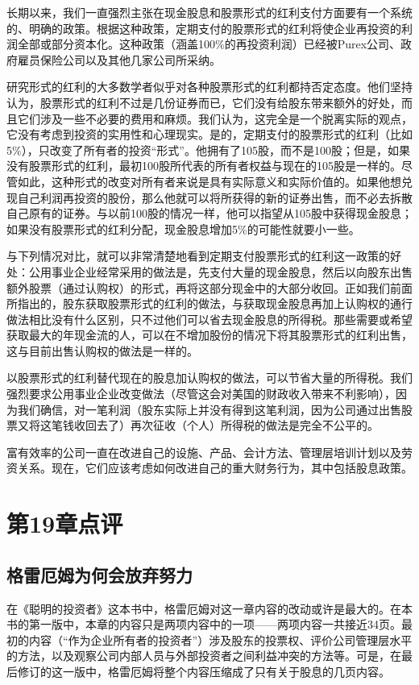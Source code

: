 \documentclass[12pt,oneside]{book}
\begin{document}
长期以来，我们一直强烈主张在现金股息和股票形式的红利支付方面要有一个系统的、明确的政策。根据这种政策，定期支付的股票形式的红利将使企业再投资的利润全部或部分资本化。这种政策（涵盖100\%的再投资利润）已经被Purex公司、政府雇员保险公司以及其他几家公司所采纳。

研究形式的红利的大多数学者似乎对各种股票形式的红利都持否定态度。他们坚持认为，股票形式的红利不过是几份证券而已，它们没有给股东带来额外的好处，而且它们涉及一些不必要的费用和麻烦。我们认为，这完全是一个脱离实际的观点，它没有考虑到投资的实用性和心理现实。是的，定期支付的股票形式的红利（比如5\%），只改变了所有者的投资“形式”。他拥有了105股，而不是100股；但是，如果没有股票形式的红利，最初100股所代表的所有者权益与现在的105股是一样的。尽管如此，这种形式的改变对所有者来说是具有实际意义和实际价值的。如果他想兑现自己利润再投资的股份，那么他就可以将所获得的新的证券出售，而不必去拆散自己原有的证券。与以前100股的情况一样，他可以指望从105股中获得现金股息；如果没有股票形式的红利分配，现金股息增加5\%的可能性就要小一些。

与下列情况对比，就可以非常清楚地看到定期支付股票形式的红利这一政策的好处：公用事业企业经常采用的做法是，先支付大量的现金股息，然后以向股东出售额外股票（通过认购权）的形式，再将这部分现金中的大部分收回。正如我们前面所指出的，股东获取股票形式的红利的做法，与获取现金股息再加上认购权的通行做法相比没有什么区别，只不过他们可以省去现金股息的所得税。那些需要或希望获取最大的年现金流的人，可以在不增加股份的情况下将其股票形式的红利出售，这与目前出售认购权的做法是一样的。

以股票形式的红利替代现在的股息加认购权的做法，可以节省大量的所得税。我们强烈要求公用事业企业改变做法（尽管这会对美国的财政收入带来不利影响），因为我们确信，对一笔利润（股东实际上并没有得到这笔利润，因为公司通过出售股票又将这笔钱收回去了）再次征收（个人）所得税的做法是完全不公平的。

富有效率的公司一直在改进自己的设施、产品、会计方法、管理层培训计划以及劳资关系。现在，它们应该考虑如何改进自己的重大财务行为，其中包括股息政策。





\section{第19章点评}
\subsection{格雷厄姆为何会放弃努力}
在《聪明的投资者》这本书中，格雷厄姆对这一章内容的改动或许是最大的。在本书的第一版中，本章的内容只是两项内容中的一项——两项内容一共接近34页。最初的内容（“作为企业所有者的投资者”）涉及股东的投票权、评价公司管理层水平的方法，以及观察公司内部人员与外部投资者之间利益冲突的方法等。可是，在最后修订的这一版中，格雷厄姆将整个内容压缩成了只有关于股息的几页内容。
\end{document}
